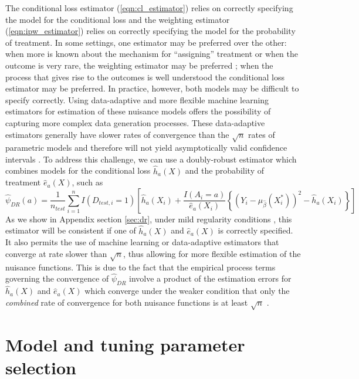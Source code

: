 The conditional loss estimator (\ref{eqn:cl_estimator}) relies on correctly specifying the model for the conditional loss and the weighting estimator (\ref{eqn:ipw_estimator})  relies on correctly specifying the model for the probability of treatment. In some settings, one estimator may be preferred over the other: when more is known about the mechanism for ``assigning'' treatment or when the outcome is very rare, the weighting estimator may be preferred \cite{robins_estimating_1992,braitman_rare_2002}; when the process that gives rise to the outcomes is well understood the conditional loss estimator may be preferred. In practice, however, both models may be difficult to specify correctly. Using data-adaptive and more flexible machine learning estimators for estimation of these nuisance models offers the possibility of capturing more complex data generation processes. These data-adaptive estimators generally have slower rates of convergence than the $\sqrt{n}$ rates of parametric models and therefore will not yield asymptotically valid confidence intervals \cite{chernozhukov_doubledebiased_2018}. To address this challenge, we can use a doubly-robust estimator which combines models for the conditional loss $\widehat{h}_a(X)$ and the probability of treatment $\widehat{e}_a(X)$, such as
\begin{equation}
    \widehat{\psi}_{DR}(a) = \frac{1}{n_{test}} \sum_{i=1}^n I(D_{test,i} = 1) \left[ \widehat{h}_a(X_i) + \frac{I(A_i = a)}{\widehat{e}_a(X_i)} \left\{ (Y_i - \mu_{\widehat{\beta}}(X^*_i))^2 - \widehat{h}_a(X_i)\right\}\right]
\end{equation}
As we show in Appendix section \ref{sec:dr}, under mild regularity conditions \cite{robins_higher_2008}, this estimator will be consistent if one of $\widehat{h}_a(X)$ and $\widehat{e}_a(X)$ is correctly specified. It also permits the use of machine learning or data-adaptive estimators that converge at rate slower than $\sqrt{n}$, thus allowing for more flexible estimation of the nuisance functions. This is due to the fact that the empirical process terms governing the convergence of $\widehat{\psi}_{DR}$ involve a product of the estimation errors for $\widehat{h}_a(X)$ and $\widehat{e}_a(X)$ which converge under the weaker condition that only the \textit{combined} rate of convergence for both nuisance functions is at least $\sqrt{n}$ \cite{chernozhukov_doubledebiased_2018}.

\section{Model and tuning parameter selection} \label{sec:selection}

